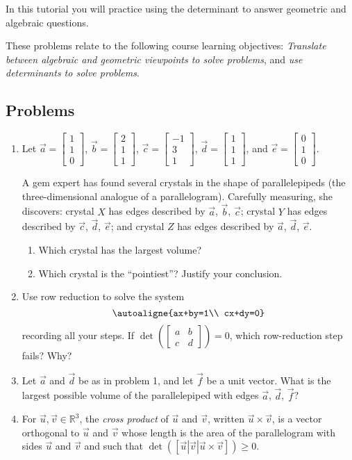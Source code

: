 \documentclass[red]{tutorial}
\newcommand{\R}{\mathbb{R}}
\newcommand{\mat}[1]{\begin{bmatrix}#1\end{bmatrix}}
\theoremstyle{definition}
\theoremstyle{theorem}
\begin{document}
	\begin{tutorial}

	\begin{objectives}
	In this tutorial you will practice using the determinant to answer geometric and algebraic questions.

	These problems relate to the following course learning objectives:
	\textit{Translate between algebraic and geometric viewpoints to solve problems}, and 
		\textit{use determinants to solve problems}.
	\end{objectives}

	\subsection*{Problems}

	\begin{enumerate}
		\item Let $\vec a=\mat{1\\1\\0}$, $\vec b=\mat{2\\1\\1}$, $\vec c=\mat{-1\\3\\1}$,
			$\vec d=\mat{1\\1\\1}$, and $\vec e=\mat{0\\1\\0}$.

			A gem expert has found several crystals in the shape of parallelepipeds (the three-dimensional
			analogue of a parallelogram). Carefully measuring, she discovers:
			crystal $X$ has edges described by $\vec a$, $\vec b$, $\vec c$; crystal $Y$ has edges described by 
			$\vec c$, $\vec d$, $\vec e$;
			and crystal $Z$ has edges described by $\vec a$, $\vec d$, $\vec e$.
			\begin{enumerate}
				\item Which crystal has the largest volume?
				\item Which crystal is the ``pointiest''? Justify your conclusion.
			\end{enumerate}
		\item Use row reduction to solve the system
			\[
				\autoaligne{ax+by=1\\ cx+dy=0}
			\]
			recording all your steps. If $\det\left(\mat{a&b\\c&d}\right)=0$, which row-reduction
			step fails? Why?
		\item Let $\vec a$ and $\vec d$ be as in problem 1, and let $\vec f$ be a unit vector.
			What is the largest possible volume of the parallelepiped with edges $\vec a$, $\vec d$, $\vec f$?
		\item For $\vec u,\vec v\in \R^3$, the \emph{cross product} of $\vec u$ and $\vec v$, written $\vec u\times \vec v$,
			is a vector orthogonal to $\vec u$ and $\vec v$ whose length is the area of the parallelogram
			with sides $\vec u$ and $\vec v$ and such that $\det([\vec u|\vec v|\vec u\times \vec v]) \geq  0$.


\end{enumerate}
\end{tutorial}
\end{document}
